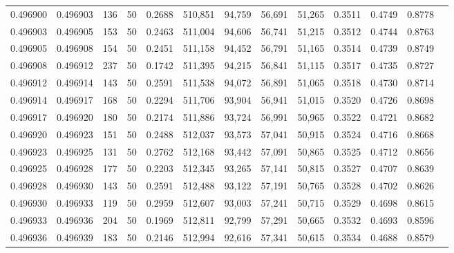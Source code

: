 \begin{tabular}{rrrrrrrrrrrrr}
0.496900 & 0.496903 &   136 &  50 &                                     0.2688 & 510,851 &  94,759 &  56,691 &  51,265 & 0.3511 & 0.4749 & 0.8778 \\
0.496903 & 0.496905 &   153 &  50 &                                     0.2463 & 511,004 &  94,606 &  56,741 &  51,215 & 0.3512 & 0.4744 & 0.8763 \\
0.496905 & 0.496908 &   154 &  50 &                                     0.2451 & 511,158 &  94,452 &  56,791 &  51,165 & 0.3514 & 0.4739 & 0.8749 \\
0.496908 & 0.496912 &   237 &  50 &                                     0.1742 & 511,395 &  94,215 &  56,841 &  51,115 & 0.3517 & 0.4735 & 0.8727 \\
0.496912 & 0.496914 &   143 &  50 &                                     0.2591 & 511,538 &  94,072 &  56,891 &  51,065 & 0.3518 & 0.4730 & 0.8714 \\
0.496914 & 0.496917 &   168 &  50 &                                     0.2294 & 511,706 &  93,904 &  56,941 &  51,015 & 0.3520 & 0.4726 & 0.8698 \\
0.496917 & 0.496920 &   180 &  50 &                                     0.2174 & 511,886 &  93,724 &  56,991 &  50,965 & 0.3522 & 0.4721 & 0.8682 \\
0.496920 & 0.496923 &   151 &  50 &                                     0.2488 & 512,037 &  93,573 &  57,041 &  50,915 & 0.3524 & 0.4716 & 0.8668 \\
0.496923 & 0.496925 &   131 &  50 &                                     0.2762 & 512,168 &  93,442 &  57,091 &  50,865 & 0.3525 & 0.4712 & 0.8656 \\
0.496925 & 0.496928 &   177 &  50 &                                     0.2203 & 512,345 &  93,265 &  57,141 &  50,815 & 0.3527 & 0.4707 & 0.8639 \\
0.496928 & 0.496930 &   143 &  50 &                                     0.2591 & 512,488 &  93,122 &  57,191 &  50,765 & 0.3528 & 0.4702 & 0.8626 \\
0.496930 & 0.496933 &   119 &  50 &                                     0.2959 & 512,607 &  93,003 &  57,241 &  50,715 & 0.3529 & 0.4698 & 0.8615 \\
0.496933 & 0.496936 &   204 &  50 &                                     0.1969 & 512,811 &  92,799 &  57,291 &  50,665 & 0.3532 & 0.4693 & 0.8596 \\
0.496936 & 0.496939 &   183 &  50 &                                     0.2146 & 512,994 &  92,616 &  57,341 &  50,615 & 0.3534 & 0.4688 & 0.8579 \\

\end{tabular}
